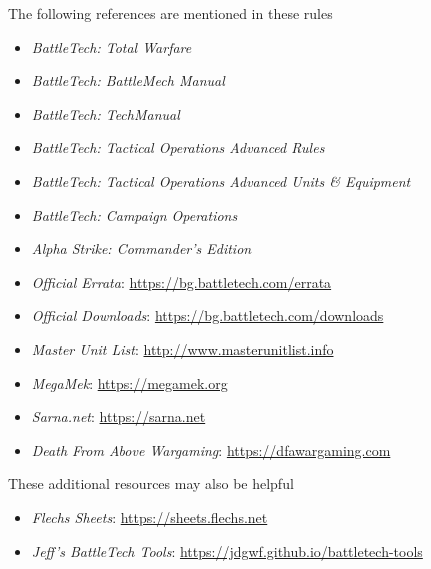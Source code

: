 The following references are mentioned in these rules

\begin{itemize}

\item \emph{BattleTech: Total Warfare}

\item \emph{BattleTech: BattleMech Manual}

\item \emph{BattleTech: TechManual}

\item \emph{BattleTech: Tactical Operations Advanced Rules}

\item \emph{BattleTech: Tactical Operations Advanced Units \& Equipment}

\item \emph{BattleTech: Campaign Operations}

\item \emph{Alpha Strike: Commander's Edition}

\item \emph{Official Errata}: \href{https://bg.battletech.com/errata}{https://bg.battletech.com/errata}

\item \emph{Official Downloads}: \href{https://bg.battletech.com/downloads}{https://bg.battletech.com/downloads}

\item \emph{Master Unit List}: \href{http://www.masterunitlist.info}{http://www.masterunitlist.info}

\item \emph{MegaMek}: \href{https://megamek.org}{https://megamek.org}

\item \emph{Sarna.net}: \href{https://sarna.net}{https://sarna.net}

\item \emph{Death From Above Wargaming}: \href{https://dfawargaming.com}{https://dfawargaming.com}

\end{itemize}

These additional resources may also be helpful

\begin{itemize}

\item \emph{Flechs Sheets}: \href{https://sheets.flechs.net}{https://sheets.flechs.net}

\item \emph{Jeff's BattleTech Tools}: \href{https://jdgwf.github.io/battletech-tools}{https://jdgwf.github.io/battletech-tools}

\end{itemize}
